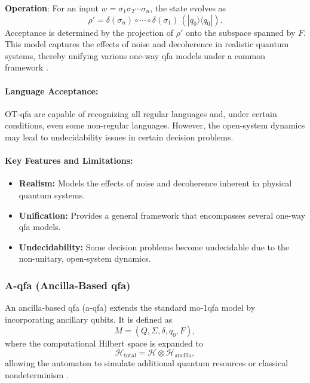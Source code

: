 \textbf{Operation}:  
For an input \( w = \sigma_1\sigma_2\cdots\sigma_n \), the state evolves as
\[
\rho' = \delta(\sigma_n) \circ \cdots \circ \delta(\sigma_1) \, (|q_0\rangle\langle q_0|).
\]
Acceptance is determined by the projection of \( \rho' \) onto the subspace spanned by \( F \). This model captures the effects of noise and decoherence in realistic quantum systems, thereby unifying various one-way qfa models under a common framework \cite{hirvensalo2012quantum}.

\paragraph{Language Acceptance:}  
OT-qfa are capable of recognizing all regular languages and, under certain conditions, even some non-regular languages. However, the open-system dynamics may lead to undecidability issues in certain decision problems.

\paragraph{Key Features and Limitations:}
\begin{itemize}
    \item \textbf{Realism:} Models the effects of noise and decoherence inherent in physical quantum systems.
    \item \textbf{Unification:} Provides a general framework that encompasses several one-way qfa models.
    \item \textbf{Undecidability:} Some decision problems become undecidable due to the non-unitary, open-system dynamics.
\end{itemize}

\subsubsection{A-qfa (Ancilla-Based qfa)}
\label{sssec:a-qfa}
\begin{definition}[A-qfa]
An ancilla-based qfa (\gls{a-qfa}) extends the standard mo-1qfa model by incorporating ancillary qubits. It is defined as 
\[
M = (Q, \Sigma, \delta, q_0, F),
\]
where the computational Hilbert space is expanded to 
\[
\mathcal{H}_{\text{total}} = \mathcal{H} \otimes \mathcal{H}_{\text{ancilla}},
\]
allowing the automaton to simulate additional quantum resources or classical nondeterminism \cite{paschen2000quantum}.
\end{definition}

